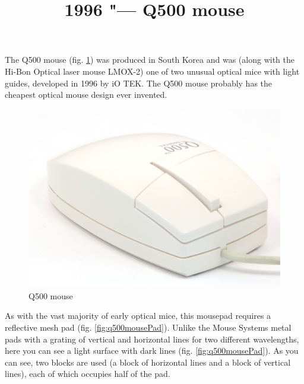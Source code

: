 \documentclass[11pt, a4paper]{article}
\begin{document}
\title{1996 "--- Q500 mouse}
\date{}
\maketitle
{}
The Q500 mouse (fig. \ref{fig:q500mousePic}) was produced in South Korea and was (along with the Hi-Bon Optical laser mouse LMOX-2) one of two unusual optical mice with light guides, developed in 1996 by iO TEK. The Q500 mouse probably has the cheapest optical mouse design ever invented.

\begin{figure}[h]
    \centering
    \includegraphics[scale=0.5]{1996_q500_mouse/pic_30.jpg}
    \caption{Q500 mouse}
    \label{fig:q500mousePic}
\end{figure}

As with the vast majority of early optical mice, this mousepad requires a reflective mesh pad (fig. \ref{fig:q500mousePad}). Unlike the Mouse Systems metal pads with a grating of vertical and horizontal lines for two different wavelengths, here you can see a light surface with dark lines (fig. \ref{fig:q500mousePad}). As you can see, two blocks are used (a block of horizontal lines and a block of vertical lines), each of which occupies half of the pad.
\end{document}
